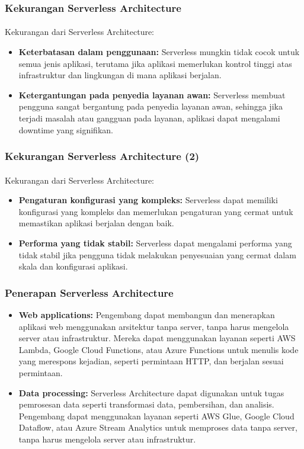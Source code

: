 \documentclass[aspectratio=169, table]{beamer}
\begin{document}
	\begin{frame}\frametitle{Kekurangan Serverless Architecture}
		\framesubtitle{\hspace{1cm}}
		Kekurangan dari Serverless Architecture:
		\begin{itemize}
			\item \textbf{Keterbatasan dalam penggunaan:} Serverless mungkin tidak cocok untuk semua jenis aplikasi, terutama jika aplikasi memerlukan kontrol tinggi atas infrastruktur dan lingkungan di mana aplikasi berjalan.
			\item \textbf{Ketergantungan pada penyedia layanan awan:} Serverless membuat pengguna sangat bergantung pada penyedia layanan awan, sehingga jika terjadi masalah atau gangguan pada layanan, aplikasi dapat mengalami downtime yang signifikan.

		\end{itemize}
	\end{frame}

	\begin{frame}\frametitle{Kekurangan Serverless Architecture (2)}
			\framesubtitle{\hspace{1cm}}
		Kekurangan dari Serverless Architecture:
		\begin{itemize}

			\item \textbf{Pengaturan konfigurasi yang kompleks:} Serverless dapat memiliki konfigurasi yang kompleks dan memerlukan pengaturan yang cermat untuk memastikan aplikasi berjalan dengan baik.
			\item \textbf{Performa yang tidak stabil:} Serverless dapat mengalami performa yang tidak stabil jika pengguna tidak melakukan penyesuaian yang cermat dalam skala dan konfigurasi aplikasi.
		\end{itemize}
	\end{frame}

	\begin{frame}\frametitle{Penerapan Serverless Architecture}
		\begin{itemize}
			\item \textbf{Web applications:} Pengembang dapat membangun dan menerapkan aplikasi web menggunakan arsitektur tanpa server, tanpa harus mengelola server atau infrastruktur. Mereka dapat menggunakan layanan seperti AWS Lambda, Google Cloud Functions, atau Azure Functions untuk menulis kode yang merespons kejadian, seperti permintaan HTTP, dan berjalan sesuai permintaan.
			\item \textbf{Data processing:} Serverless Architecture dapat digunakan untuk tugas pemrosesan data seperti transformasi data, pembersihan, dan analisis. Pengembang dapat menggunakan layanan seperti AWS Glue, Google Cloud Dataflow, atau Azure Stream Analytics untuk memproses data tanpa server, tanpa harus mengelola server atau infrastruktur.

		\end{itemize}
	\end{frame}
\end{document}
